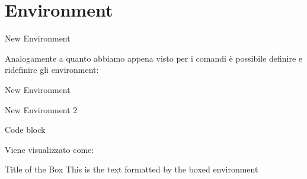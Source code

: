 \section{Environment}
\begin{frame}{New Environment}

Analogamente a quanto abbiamo appena visto per i comandi \`e possibile definire e ridefinire gli environment:

\begin{esempio}{New Environment}
\end{esempio}

\end{frame}

\begin{frame}{New Environment 2}

\begin{esempio}{Code block}
\end{esempio}
Viene visualizzato come:
\begin{ourboxed}{Title of the Box}
This is the text formatted by the boxed environment
\end{ourboxed}

\end{frame}